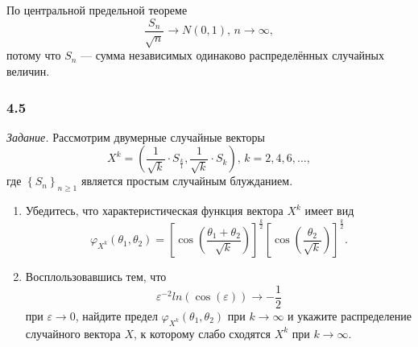 По центральной предельной теореме
$$ \frac{S_n}{ \sqrt{n}} \to N \left( 0, 1 \right), \,
  n \to \infty,$$
потому что $S_n$ --- сумма независимых одинаково распределённых случайных величин.

\subsubsection*{4.5}

\textit{Задание.}
Рассмотрим двумерные случайные векторы
$$X^k = \left( \frac{1}{ \sqrt{k}} \cdot S_{ \frac{k}{1}}, \frac{1}{ \sqrt{k}} \cdot S_k \right), \,
  k = 2, 4, 6, \dotsc,$$
где $ \left\{ S_n \right\}_{n \geq 1}$ является простым случайным блужданием.
\begin{enumerate}[label=\alph*)]
  \item Убедитесь, что характеристическая функция вектора $X^k$ имеет вид
  $$ \varphi_{X^k} \left( \theta_1, \theta_2 \right) =
    \left[ \cos \left( \frac{ \theta_1 + \theta_2}{ \sqrt{k}} \right) \right]^{ \frac{k}{2}}
    \left[ \cos \left( \frac{ \theta_2}{ \sqrt{k}} \right) \right]^{ \frac{k}{2}}.$$
  \item Восплользовавшись тем, что
  $$ \varepsilon^{-2} ln \left( \cos \left( \varepsilon \right) \right) \to
    - \frac{1}{2}$$
  при $ \varepsilon \to 0$,
  найдите предел $ \varphi_{X^k} \left( \theta_1, \theta_2 \right) $ при $k \to \infty $
  и укажите распределение случайного вектора $X$,
  к которому слабо сходятся $X^k$ при $k \to \infty$.
\end{enumerate}


